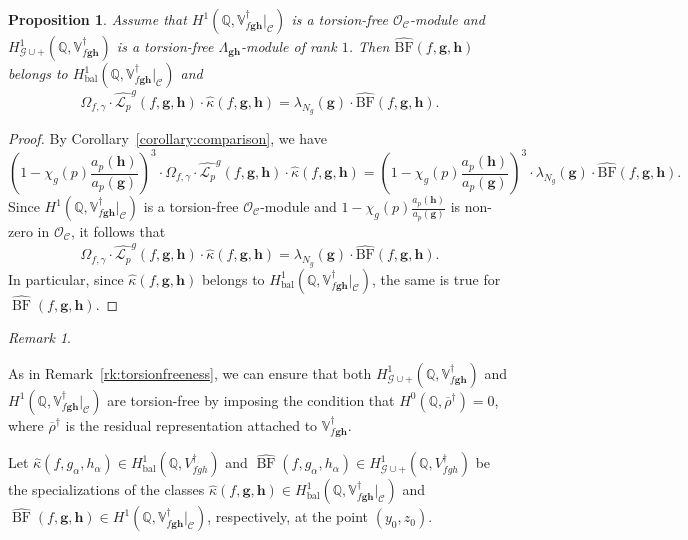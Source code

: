 \documentclass[a4paper,11pt]{amsart}
\theoremstyle{plain}
\newtheorem{proposition}[theorem]{Proposition}
\theoremstyle{definition}
\theoremstyle{remark}
\newtheorem{remarkwr}[theorem]{Remark}
\newenvironment{remark}{\begin{remarkwr}\begin{upshape}}{\end{upshape}\end{remarkwr}}
\newcommand{\bb}{\mathbb}
\newcommand{\cl}{\mathcal}
\DeclareMathOperator{\BF}{BF}
\DeclareMathOperator{\bal}{bal}
\newcommand{\Lp}{{\mathscr{L}_p}}
\newcommand{\hg}{{\mathbf{g}}}
\newcommand{\hh}{{\mathbf h}}
\numberwithin{equation}{section}
\begin{document}
\begin{proposition}
    Assume that $H^1(\bb{Q},\bb{V}_{f\hg\hh}^\dagger\vert_{\cl{C}})$ is a torsion-free $\cl{O}_{\cl{C}}$-module and $H^1_{\cl{G}\cup +}(\bb{Q},\bb{V}_{f\hg\hh}^\dagger)$ is a torsion-free $\Lambda_{\hg\hh}$-module of rank $1$. Then $\widehat{\mathrm{BF}}(f, \hg, \hh)$ belongs to $H^1_{\bal}(\bb{Q},\bb{V}_{f\hg\hh}^\dagger\vert_{\cl{C}})$ and
    \[
    \Omega_{f,\gamma} \cdot \widehat{\Lp}^g(f,\hg,\hh) \cdot \widehat{\kappa}(f,\hg,\hh) = \lambda_{N_g}(\hg)\cdot\widehat{\mathrm{BF}}(f, \hg, \hh).
    \]
\end{proposition}
\begin{proof}
    By Corollary~\ref{corollary:comparison}, we have
    \[
    \left(1-\chi_g(p)\frac{a_p(\hh)}{a_p(\hg)}\right)^3\cdot\Omega_{f,\gamma} \cdot \widehat{\Lp}^g(f,\hg,\hh) \cdot \widehat{\kappa}(f,\hg,\hh) = \left(1-\chi_g(p)\frac{a_p(\hh)}{a_p(\hg)}\right)^3\cdot \lambda_{N_g}(\hg)\cdot\widehat{\mathrm{BF}}(f, \hg, \hh).
    \]
    Since $H^1(\bb{Q},\bb{V}_{f\hg\hh}^\dagger\vert_{\cl{C}})$ is a torsion-free $\cl{O}_{\cl{C}}$-module and $1-\chi_g(p)\frac{a_p(\hh)}{a_p(\hg)}$ is non-zero in $\cl{O}_{\cl{C}}$, it follows that
    \[
    \Omega_{f,\gamma} \cdot \widehat{\Lp}^g(f,\hg,\hh) \cdot \widehat{\kappa}(f,\hg,\hh) = \lambda_{N_g}(\hg)\cdot\widehat{\mathrm{BF}}(f, \hg, \hh).
    \]
    In particular, since $\widehat{\kappa}(f,\hg,\hh)$ belongs to $H^1_{\bal}(\bb{Q},\bb{V}_{f\hg\hh}^\dagger\vert_{\cl{C}})$, the same is true for $\widehat{\BF}(f,\hg,\hh)$.
\end{proof}

\begin{remark}
    As in Remark~\ref{rk:torsionfreeness}, we can ensure that both $H^1_{\cl{G}\cup +}(\bb{Q}, \bb{V}_{f\hg\hh}^\dagger)$ and $H^1(\bb{Q},\bb{V}_{f\hg\hh}^\dagger\vert_{\cl{C}})$ are torsion-free by imposing the condition that $H^0(\bb{Q},\overline{\rho}^\dagger)=0$, where $\overline{\rho}^\dagger$ is the residual representation attached to $\bb{V}_{f\hg \hh}^\dagger$.
\end{remark}


Let $\widehat{\kappa}(f,g_\alpha,h_\alpha)\in H^1_{\bal}(\bb{Q},V_{fgh}^\dagger)$ and $\widehat{\BF}(f,g_\alpha,h_\alpha)\in H^1_{\cl{G}\cup +}(\bb{Q},V_{fgh}^\dagger)$ be the specializations of the classes $\widehat{\kappa}(f,\hg,\hh)\in H^1_{\bal}(\bb{Q},\bb{V}_{f\hg\hh}^\dagger\vert_{\cl{C}})$ and $\widehat{\BF}(f,\hg,\hh)\in H^1(\bb{Q},\bb{V}_{f\hg\hh}^\dagger\vert_{\cl{C}})$, respectively, at the point $(y_0,z_0)$.
\end{document}
